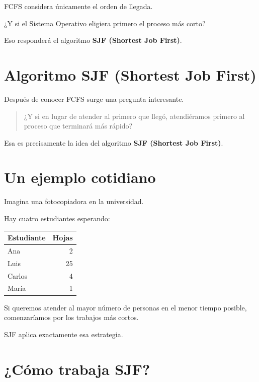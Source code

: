 \documentclass[
  spanish,
  letterpaper,
]{scrbook}
\newcounter{none} %
\begin{document}
FCFS considera únicamente el orden de llegada.

¿Y si el Sistema Operativo eligiera primero el proceso más corto?

Eso responderá el algoritmo \textbf{SJF (Shortest Job First)}.


\chapter{Algoritmo SJF (Shortest Job
First)}\label{algoritmo-sjf-shortest-job-first}

Después de conocer FCFS surge una pregunta interesante.

\begin{quote}
¿Y si en lugar de atender al primero que llegó, atendiéramos primero al
proceso que terminará más rápido?
\end{quote}

Esa es precisamente la idea del algoritmo \textbf{SJF (Shortest Job
First)}.


\chapter{Un ejemplo cotidiano}\label{un-ejemplo-cotidiano-1}

Imagina una fotocopiadora en la universidad.

Hay cuatro estudiantes esperando:

{\def\LTcaptype{none} %
\begin{longtable}[]{@{}lr@{}}
\toprule\noalign{}
Estudiante & Hojas \\
\midrule\noalign{}
\endhead
\bottomrule\noalign{}
\endlastfoot
Ana & 2 \\
Luis & 25 \\
Carlos & 4 \\
María & 1 \\
\end{longtable}
}

Si queremos atender al mayor número de personas en el menor tiempo
posible, comenzaríamos por los trabajos más cortos.

SJF aplica exactamente esa estrategia.


\chapter{¿Cómo trabaja SJF?}\label{cuxf3mo-trabaja-sjf}
\end{document}
